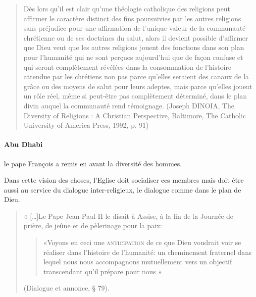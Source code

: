 \begin{quote}
    Dès lors qu’il est clair qu’une théologie catholique des religions peut affirmer le caractère distinct des fins poursuivies par les autres religions sans préjudice pour une affirmation de l’unique valeur de la communauté chrétienne ou de ses doctrines du salut, alors il devient possible d’affirmer que Dieu veut que les autres religions jouent des fonctions dans son plan pour l’humanité qui ne sont perçues aujourd’hui que de façon confuse et qui seront complètement révélées dans la consommation de l’histoire attendue par les chrétiens non pas parce qu’elles seraient des canaux de la grâce ou des moyens de salut pour leurs adeptes, mais parce qu’elles jouent un rôle réel, même si peut-être pas complètement déterminé, dans le plan divin auquel la communauté rend témoignage. (Joseph DINOIA, The Diversity of Religions : A Christian Perspective, Baltimore, The Catholic University of America Press, 1992, p. 91) 
\end{quote}    
  
  \paragraph{Abu Dhabi}
  le pape François a remis en avant la diversité des hommes.
  
  Dans cette vision des choses, l'Eglise doit socialiser ces membres mais doit être aussi au service du dialogue inter-religieux, le dialogue comme dans le plan de Dieu. 
  
\begin{quote}
    « […]Le Pape Jean-Paul II le disait à Assise, à la fin de la Journée de prière, de jeûne et de pèlerinage pour la paix: 
    \begin{quote}
       «Voyons en ceci une \textsc{anticipation} de ce que Dieu voudrait voir se réaliser dans l’histoire de l’humanité: un cheminement fraternel dans lequel nous nous accompagnons mutuellement vers un objectif transcendant qu’il prépare pour nous »  
    \end{quote}
    (Dialogue et annonce, § 79). 
\end{quote}  
  
